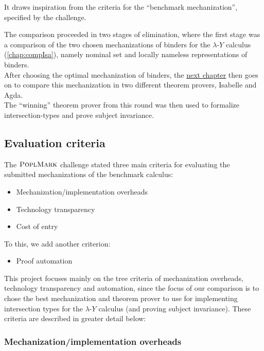 \documentclass[a4paper, 12pt, twoside]{style/ociamthesis}
\theoremstyle{plain}
\theoremstyle{definition}
\theoremstyle{remark}
\providecommand{\tightlist}{%
  \setlength{\itemsep}{0pt}\setlength{\parskip}{0pt}}
\newcommand{\lamy}{\lambda\text{-}Y}
\newcommand{\poplm}{\textsc{PoplMark}}
\begin{document}
It draws inspiration from the criteria for the ``benchmark
mechanization'', specified by the challenge.

The comparison proceeded in two stages of elimination, where the first
stage was a comparison of the two chosen mechanizations of binders for
the \(\lamy\) calculus (\cref{chap:compIsa}), namely nominal set and
locally nameless representations of binders.\\
After choosing the optimal mechanization of binders, the
\hyperref[chap:compAgda]{next chapter} then goes on to compare this
mechanization in two different theorem provers, Isabelle and Agda.\\
The ``winning'' theorem prover from this round was then used to
formalize intersection-types and prove subject invariance.

\subsection{Evaluation criteria}\label{evaluation-criteria}

The \(\poplm\) challenge stated three main criteria for evaluating the
submitted mechanizations of the benchmark calculus:

\begin{itemize}
\tightlist
\item
  Mechanization/implementation overheads
\item
  Technology transparency
\item
  Cost of entry
\end{itemize}

To this, we add another criterion:

\begin{itemize}
\tightlist
\item
  Proof automation
\end{itemize}

This project focuses mainly on the tree criteria of mechanization
overheads, technology transparency and automation, since the focus of
our comparison is to chose the best mechanization and theorem prover to
use for implementing intersection types for the \(\lamy\) calculus (and
proving subject invariance). These criteria are described in greater
detail below:

\subsubsection{Mechanization/implementation
overheads}\label{mechanizationimplementation-overheads}
\end{document}
